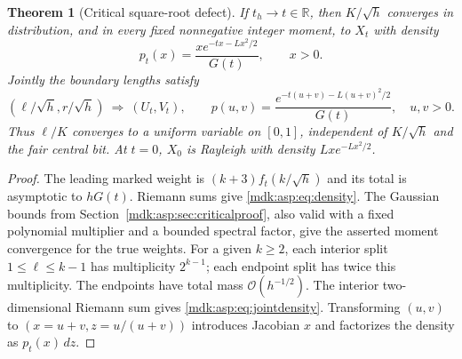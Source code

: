 \documentclass[11pt,letterpaper]{article}
\numberwithin{equation}{section}
\newtheorem{theorem}{Theorem}[section]
\theoremstyle{remark}\newtheorem{remark}[theorem]{Remark}
\newcommand{\Oh}{\mathcal O}\newcommand{\Q}{\mathbb Q}\newcommand{\N}{\mathbb N}\newcommand{\R}{\mathbb R}
\begin{document}
\begin{theorem}[Critical square-root defect]\label{mdk:asp:thm:law-critical}
If $t_h\to t\in\R$, then $K/\sqrt h$ converges in distribution, and in every fixed nonnegative integer moment, to $X_t$ with density
\begin{equation}\label{mdk:asp:eq:density}
p_t(x)=\frac{x e^{-tx-Lx^2/2}}{G(t)},\qquad x>0.
\end{equation}
Jointly the boundary lengths satisfy
\begin{equation}\label{mdk:asp:eq:jointdensity}
(\ell/\sqrt h,r/\sqrt h)\ \Longrightarrow\ (U_t,V_t),\qquad
p(u,v)=\frac{e^{-t(u+v)-L(u+v)^2/2}}{G(t)},\quad u,v>0.
\end{equation}
Thus $\ell/K$ converges to a uniform variable on $[0,1]$, independent of $K/\sqrt h$ and the fair central bit. At $t=0$, $X_0$ is Rayleigh with density $Lxe^{-Lx^2/2}$.
\end{theorem}
\begin{proof}
The leading marked weight is $(k+3)f_t(k/\sqrt h)$ and its total is asymptotic to $hG(t)$. Riemann sums give \eqref{mdk:asp:eq:density}. The Gaussian bounds from Section~\ref{mdk:asp:sec:criticalproof}, also valid with a fixed polynomial multiplier and a bounded spectral factor, give the asserted moment convergence for the true weights. For a given $k\ge2$, each interior split $1\le\ell\le k-1$ has multiplicity $2^{k-1}$; each endpoint split has twice this multiplicity. The endpoints have total mass $\Oh(h^{-1/2})$. The interior two-dimensional Riemann sum gives \eqref{mdk:asp:eq:jointdensity}. Transforming $(u,v)$ to $(x=u+v,z=u/(u+v))$ introduces Jacobian $x$ and factorizes the density as $p_t(x)\,dz$.
\end{proof}
\end{document}
